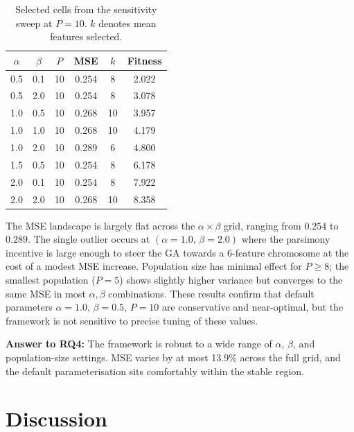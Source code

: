 \documentclass[11pt,a4paper]{article}
\begin{document}
\begin{table}[!htbp]
\centering
\caption{Selected cells from the sensitivity sweep at $P=10$.
         $k$ denotes mean features selected.}
\label{tab:sensitivity}
\renewcommand{\arraystretch}{1.15}
\begin{tabular}{@{}cccccc@{}}
\toprule
$\alpha$ & $\beta$ & $P$ & \textbf{MSE} & $k$ & \textbf{Fitness} \\
\midrule
0.5 & 0.1 & 10 & 0.254 &  8 & 2.022 \\
0.5 & 2.0 & 10 & 0.254 &  8 & 3.078 \\
1.0 & 0.5 & 10 & 0.268 & 10 & 3.957 \\
1.0 & 1.0 & 10 & 0.268 & 10 & 4.179 \\
1.0 & 2.0 & 10 & 0.289 &  6 & 4.800 \\
1.5 & 0.5 & 10 & 0.254 &  8 & 6.178 \\
2.0 & 0.1 & 10 & 0.254 &  8 & 7.922 \\
2.0 & 2.0 & 10 & 0.268 & 10 & 8.358 \\
\bottomrule
\end{tabular}
\end{table}

The MSE landscape is largely flat across the $\alpha \times \beta$ grid,
ranging from $0.254$ to $0.289$. The single outlier occurs at
$(\alpha=1.0,\,\beta=2.0)$ where the parsimony incentive is large enough to
steer the GA towards a 6-feature chromosome at the cost of a modest MSE increase.
Population size has minimal effect for $P \ge 8$; the smallest population
($P=5$) shows slightly higher variance but converges to the same MSE in most
$\alpha, \beta$ combinations. These results confirm that default parameters
$\alpha=1.0,\,\beta=0.5,\,P=10$ are conservative and near-optimal, but
the framework is not sensitive to precise tuning of these values.

\textbf{Answer to RQ4:} The framework is robust to a wide range of
$\alpha$, $\beta$, and population-size settings. MSE varies by at most
13.9\% across the full grid, and the default parameterisation sits comfortably
within the stable region.

\section{Discussion}
\label{sec:discussion}
\end{document}
